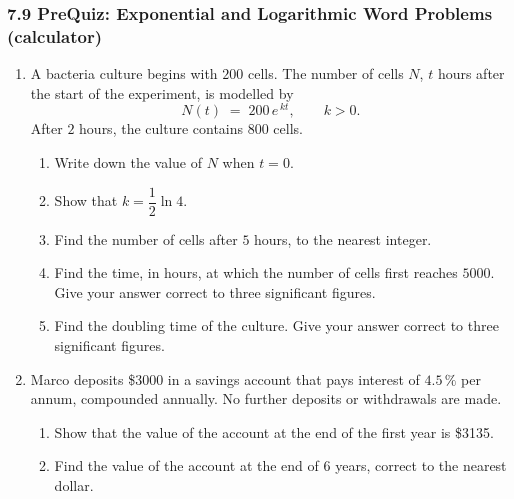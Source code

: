 \documentclass[12pt, twoside]{article}
\begin{document}
\subsubsection*{7.9 PreQuiz: Exponential and Logarithmic Word Problems
(calculator)}

\begin{enumerate}[itemsep=0.15cm]

\item[1.] A bacteria culture begins with $200$ cells. The number of
cells $N$, $t$ hours after the start of the experiment, is modelled by
$$N(t) \;=\; 200\, e^{\,k t}, \qquad k > 0.$$
After $2$ hours, the culture contains $800$ cells.

\begin{enumerate}[itemsep=0.15cm]
  \item Write down the value of $N$ when $t = 0$.

  \item Show that $k = \dfrac{1}{2}\ln 4$.

  \item Find the number of cells after $5$ hours, to the nearest
  integer.

  \item Find the time, in hours, at which the number of cells first
  reaches $5000$. Give your answer correct to three significant
  figures.

  \item Find the doubling time of the culture. Give your answer correct
  to three significant figures.
\end{enumerate}


\newpage

\item[2.] Marco deposits \$3000 in a savings account that pays interest
of $4.5\,\%$ per annum, compounded annually. No further deposits or
withdrawals are made.

\begin{enumerate}[itemsep=0.15cm]
  \item Show that the value of the account at the end of the first
  year is \$3135.

  \item Find the value of the account at the end of $6$ years, correct
  to the nearest dollar.


\end{enumerate}
\end{enumerate}
\end{document}
